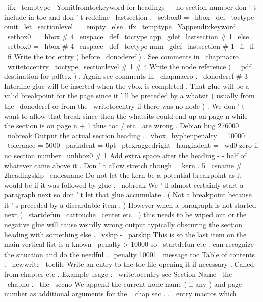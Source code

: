 {{{{{{\
ifx
\
temptype
\
Yomitfromtockeyword
%
for
headings
-
-
no
section
number
don
'
t
include
in
toc
%
and
don
'
t
redefine
\
lastsection
.
\
setbox0
=
\
hbox
{
}
%
\
def
\
toctype
{
omit
}
%
\
let
\
sectionlevel
=
\
empty
\
else
\
ifx
\
temptype
\
Yappendixkeyword
\
setbox0
=
\
hbox
{
#
4
\
enspace
}
%
\
def
\
toctype
{
app
}
%
\
gdef
\
lastsection
{
#
1
}
%
\
else
\
setbox0
=
\
hbox
{
#
4
\
enspace
}
%
\
def
\
toctype
{
num
}
%
\
gdef
\
lastsection
{
#
1
}
%
\
fi
\
fi
\
fi
%
%
Write
the
toc
entry
(
before
\
donoderef
)
.
See
comments
in
\
chapmacro
.
\
writetocentry
{
\
toctype
\
sectionlevel
}
{
#
1
}
{
#
4
}
%
%
%
Write
the
node
reference
(
=
pdf
destination
for
pdftex
)
.
%
Again
see
comments
in
\
chapmacro
.
\
donoderef
{
#
3
}
%
%
%
Interline
glue
will
be
inserted
when
the
vbox
is
completed
.
%
That
glue
will
be
a
valid
breakpoint
for
the
page
since
it
'
ll
be
%
preceded
by
a
whatsit
(
usually
from
the
\
donoderef
or
from
the
%
\
writetocentry
if
there
was
no
node
)
.
We
don
'
t
want
to
allow
that
%
break
since
then
the
whatsits
could
end
up
on
page
n
while
the
%
section
is
on
page
n
+
1
thus
toc
/
etc
.
are
wrong
.
Debian
bug
276000
.
\
nobreak
%
%
Output
the
actual
section
heading
.
\
vbox
{
\
hyphenpenalty
=
10000
\
tolerance
=
5000
\
parindent
=
0pt
\
ptexraggedright
\
hangindent
=
\
wd0
%
zero
if
no
section
number
\
unhbox0
#
1
}
%
}
%
%
Add
extra
space
after
the
heading
-
-
half
of
whatever
came
above
it
.
%
Don
'
t
allow
stretch
though
.
\
kern
.
5
\
csname
#
2headingskip
\
endcsname
%
%
Do
not
let
the
kern
be
a
potential
breakpoint
as
it
would
be
if
it
%
was
followed
by
glue
.
\
nobreak
%
%
We
'
ll
almost
certainly
start
a
paragraph
next
so
don
'
t
let
that
%
glue
accumulate
.
(
Not
a
breakpoint
because
it
'
s
preceded
by
a
%
discardable
item
.
)
However
when
a
paragraph
is
not
started
next
%
(
\
startdefun
\
cartouche
\
center
etc
.
)
this
needs
to
be
wiped
out
%
or
the
negative
glue
will
cause
weirdly
wrong
output
typically
%
obscuring
the
section
heading
with
something
else
.
\
vskip
-
\
parskip
%
%
This
is
so
the
last
item
on
the
main
vertical
list
is
a
known
%
\
penalty
>
10000
so
\
startdefun
etc
.
can
recognize
the
situation
%
and
do
the
needful
.
\
penalty
10001
}
\
message
{
toc
}
%
Table
of
contents
.
\
newwrite
\
tocfile
%
Write
an
entry
to
the
toc
file
opening
it
if
necessary
.
%
Called
from
chapter
etc
.
%
%
Example
usage
:
\
writetocentry
{
sec
}
{
Section
Name
}
{
\
the
\
chapno
.
\
the
\
secno
}
%
We
append
the
current
node
name
(
if
any
)
and
page
number
as
additional
%
arguments
for
the
\
{
chap
sec
.
.
.
}
entry
macros
which
}}}}

